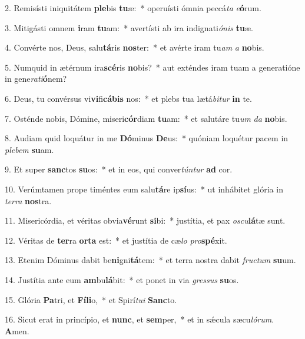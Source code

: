 2. Remisísti iniquitátem \textbf{ple}bis \textbf{tu}æ:~*  operuísti ómnia peccá\textit{ta} \textit{e}\textbf{ó}rum.\

3. Mitigásti omnem \textbf{i}ram \textbf{tu}am:~*  avertísti ab ira indignati\textit{ó}\textit{nis} \textbf{tu}æ.\

4. Convérte nos, Deus, salu\textbf{tá}ris \textbf{nos}ter:~*  et avérte iram tu\textit{am} \textit{a} \textbf{no}bis.\

5. Numquid in ætérnum ira\textbf{scé}ris \textbf{no}bis?~*  aut exténdes iram tuam a generatióne in gene\textit{ra}\textit{ti}\textbf{ó}nem?\

6. Deus, tu convérsus vi\textbf{vi}fi\textbf{cá}\textbf{bis} nos:~*  et plebs tua lætá\textit{bi}\textit{tur} \textbf{in} te.\

7. Osténde nobis, Dómine, miseri\textbf{cór}diam \textbf{tu}am:~*  et salutáre tu\textit{um} \textit{da} \textbf{no}bis.\

8. Audiam quid loquátur in me \textbf{Dó}minus \textbf{De}us:~*  quóniam loquétur pacem in \textit{ple}\textit{bem} \textbf{su}am.\

9. Et super \textbf{sanc}tos \textbf{su}os:~*  et in eos, qui conver\textit{tún}\textit{tur} \textbf{ad} cor.\

10. Verúmtamen prope timéntes eum salu\textbf{tá}re ip\textbf{sí}us:~*  ut inhábitet glória in \textit{ter}\textit{ra} \textbf{nos}tra.\

11. Misericórdia, et véritas obvia\textbf{vé}runt \textbf{si}bi:~*  justítia, et pax \textit{os}\textit{cu}\textbf{lá}tæ sunt.\

12. Véritas de \textbf{ter}ra \textbf{or}\textbf{ta} est:~*  et justítia de cæ\textit{lo} \textit{pro}\textbf{spé}xit.\

13. Etenim Dóminus dabit be\textbf{ni}gni\textbf{tá}tem:~*  et terra nostra dabit \textit{fruc}\textit{tum} \textbf{su}um.\

14. Justítia ante eum \textbf{am}bu\textbf{lá}bit:~*  et ponet in via \textit{gres}\textit{sus} \textbf{su}os.\

15. Glória \textbf{Pa}tri, et \textbf{Fí}\textbf{li}o,~*  et Spirí\textit{tu}\textit{i} \textbf{Sanc}to.\

16. Sicut erat in princípio, et \textbf{nunc}, et \textbf{sem}per,~*  et in sǽcula sæcu\textit{ló}\textit{rum}. \textbf{A}men.\

